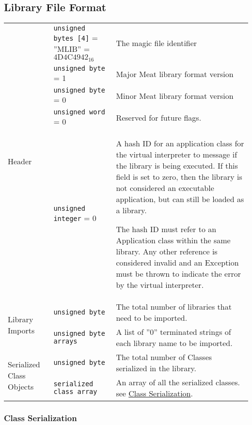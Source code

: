 \subsection{Library File Format}

\begin{center}
  \begin{tabular}{ |l|p{4.5cm}|p{7.5cm}| }
    \hline
    \multirow{5}{*}{Header} & \texttt{unsigned bytes [4]} = ''MLIB''
    = $\mathrm{4D4C4942}_{16}$ & The
    magic file identifier\\ \cline{2-3}
    & \texttt{unsigned byte} = 1 & Major Meat library format version\\
    \cline{2-3}
    & \texttt{unsigned byte} = 0 & Minor Meat library format version\\
    \cline{2-3}
    & \texttt{unsigned word} = 0 & Reserved for future flags.\\ \cline{2-3}
    & \texttt{unsigned integer} = 0 & A hash ID for an application class for
    the virtual interpreter to message if the library is being executed.
    If this field is set to zero, then the library is not considered an
    executable application, but can still be loaded as a library.

    The hash ID must refer to an Application class within the same library.
    Any other reference is considered invalid and an Exception must be
    thrown to indicate the error by the virtual interpreter.\\
    \hline

    \multirow{2}{*}{Library Imports} & \texttt{unsigned byte} & The total number of libraries that need to be imported.\\ \cline{2-3}
    & \texttt{unsigned byte arrays} & A list of ''0'' terminated strings of each library name to be imported.\\ \hline

    \multirow{2}{*}{Serialized Class Objects} & \texttt{unsigned byte} & The total number of Classes serialized in the library.\\ \cline{2-3}
    & \texttt{serialized class array} & An array of all the serialized classes. see \hyperref[sec:class_serial]{Class Serialization}.\\ \hline
  \end{tabular}
\end{center}

\subsubsection{Class Serialization}
\label{sec:class_serial}

